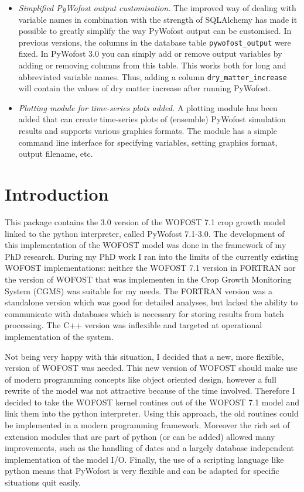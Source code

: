 \documentclass[12pt]{article}
\begin{document}
\begin{itemize}
\item \emph{Simplified PyWofost output customisation.} The improved way of dealing with variable names in combination with the strength of SQLAlchemy has made it possible to greatly simplify the way PyWofost output can be customised. In previous versions, the columns in the database table \texttt{pywofost\_output} were fixed. In PyWofost 3.0 you can simply add or remove output variables by adding or removing columns from this table. This works both for long and abbreviated variable names. Thus, adding a column \texttt{dry\_matter\_increase} will contain the values of dry matter increase after running PyWofost.
\item \emph{Plotting module for time-series plots added.} A plotting module has been added that can create time-series plots of (ensemble) PyWofost simulation results and supports various graphics formats. The module has a simple command line interface for specifying variables, setting graphics format, output filename, etc.
\end{itemize}


\section{Introduction}

This package contains the 3.0 version of the WOFOST 7.1 crop growth model linked to the python interpreter, called PyWofost 7.1-3.0. The development of this implementation of the WOFOST model was done in the framework of my PhD research. During my PhD work I ran into the limits of the currently existing WOFOST implementations: neither the WOFOST 7.1 version in FORTRAN nor the version of WOFOST that was implementen in the Crop Growth Monitoring System (CGMS) was suitable for my needs. The FORTRAN version was a standalone version which was good for detailed analyses, but lacked the ability to communicate with databases which is necessary for storing results from batch processing. The C++ version was inflexible and targeted at operational implementation of the system. 

Not being very happy with this situation, I decided that a new, more flexible, version of WOFOST was needed. This new version of WOFOST should make use of modern programming concepts like object oriented design, however a full rewrite of the model was not attractive because of the time involved. Therefore I decided to take the WOFOST kernel routines out of the WOFOST 7.1 model and link them into the python interpreter. Using this approach, the old routines could be implemented in a modern programming framework. Moreover the rich set of extension modules that are part of python (or can be added) allowed many improvements, such as the handling of dates and a largely database independent implementation of the model I/O. Finally, the use of a scripting language like python means that PyWofost is very flexible and can be adapted for specific situations quit easily.
\end{document}
